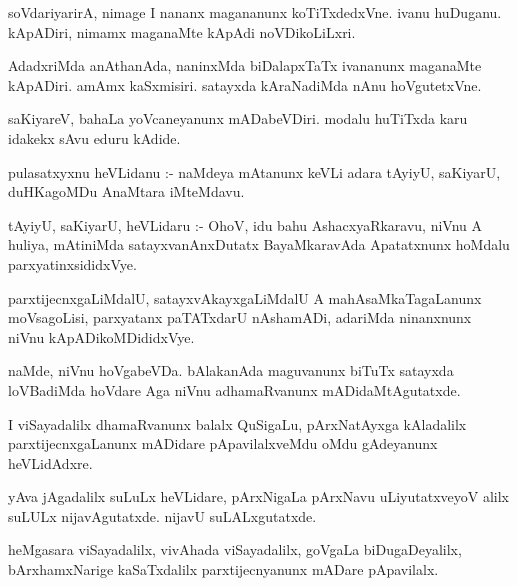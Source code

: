 \documentclass{article}
\begin{document}
\begin{mn}
soVdariyarirA,  nimage  I  nananx  magananunx  koTiTxdedxVne.  ivanu  huDuganu.  
kApADiri,  nimamx  maganaMte  kApAdi  noVDikoLiLxri.
\end{mn}

\begin{mn}
AdadxriMda  anAthanAda,  naninxMda  biDalapxTaTx  ivananunx  maganaMte  kApADiri.  
amAmx  kaSxmisiri.  satayxda  kAraNadiMda  nAnu  hoVgutetxVne.
\end{mn}

\begin{mn}
saKiyareV,  bahaLa  yoVcaneyanunx  mADabeVDiri.  modalu  huTiTxda  karu  idakekx  
sAvu  eduru kAdide.
\end{mn}

\begin{mn}
pulasatxyxnu  heVLidanu :- naMdeya mAtanunx  keVLi  adara  tAyiyU,  saKiyarU,  
duHKagoMDu  AnaMtara  iMteMdavu.  
\end{mn}

\begin{mn}
tAyiyU,  saKiyarU,  heVLidaru :- OhoV,  idu  bahu AshacxyaRkaravu,  niVnu  A huliya, 
mAtiniMda  satayxvanAnxDutatx  BayaMkaravAda  Apatatxnunx  hoMdalu  parxyatinxsididxVye.
\end{mn}

\begin{mn}
parxtijecnxgaLiMdalU,  satayxvAkayxgaLiMdalU  A  mahAsaMkaTagaLanunx  moVsagoLisi,  
parxyatanx paTATxdarU  nAshamADi,  adariMda  ninanxnunx  niVnu  kApADikoMDididxVye.
\end{mn}

\begin{mn}
naMde,  niVnu  hoVgabeVDa.  bAlakanAda  maguvanunx  biTuTx  satayxda  loVBadiMda  
hoVdare  Aga  niVnu  adhamaRvanunx  mADidaMtAgutatxde.
\end{mn}

\begin{mn}
I viSayadalilx  dhamaRvanunx  balalx  QuSigaLu,  pArxNatAyxga kAladalilx  parxtijecnxgaLanunx  
mADidare  pApavilalxveMdu  oMdu  gAdeyanunx  heVLidAdxre.
\end{mn}

\begin{mn}
yAva jAgadalilx  suLuLx  heVLidare,  pArxNigaLa  pArxNavu  uLiyutatxveyoV  alilx  suLULx  
nijavAgutatxde.  nijavU  suLALxgutatxde.
\end{mn}

\begin{mn}
heMgasara  viSayadalilx, vivAhada  viSayadalilx,  goVgaLa  biDugaDeyalilx,  
bArxhamxNarige  kaSaTxdalilx  parxtijecnyanunx  mADare  pApavilalx.
\end{mn}
\end{document}
